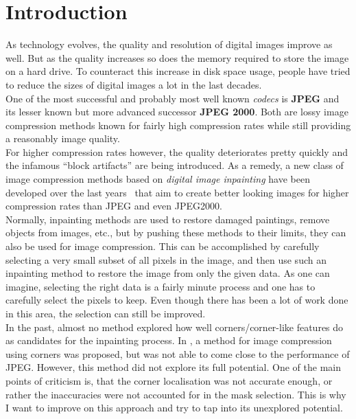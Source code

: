 \chapter{Introduction}\label{ch:Intro}
As technology evolves, the quality and resolution of digital images improve as well. But as the
quality increases so does the memory required to store the image on a hard drive. To counteract
this increase in disk space usage, people have tried to reduce the sizes of digital images a lot in the
last decades.\\
One of the most successful and probably most well known \textit{codecs}
is \textbf{JPEG}\cite{wallace91} and its lesser known but more advanced successor \textbf{JPEG 2000}\cite{jpeg2000}. Both are lossy image compression methods
known for fairly high compression rates while still providing a reasonably image quality.\\
For
higher compression rates however, the quality deteriorates pretty quickly and the infamous ``block
artifacts'' are being introduced. As a remedy, a new class of image compression methods based on
\textit{digital image inpainting} have been developed over the last
years~\cite{galic05, galic08, mainberger12, peloquin09, zimmer07, mainberger09, mainberger10, dong07, schmaltz09} that
aim to create better looking images for higher compression rates than JPEG and even JPEG2000. \\
Normally, inpainting methods are used to restore damaged paintings, remove objects from images,
etc., but by pushing these methods to their limits, they can also be used for image compression.
This can be accomplished by carefully selecting a very small subset of all pixels in the image, 
and then use such an inpainting method to restore the image from only the given data.
As one can imagine, selecting the right data is a fairly minute process and one has to carefully
select the pixels to keep. Even though there has been a lot of work done in this
area\cite{belhachmi09, schmaltz14, hoeltgen12}, the
selection can still be improved.\\
In the past, almost no method explored how well corners/corner-like features do as candidates for
the inpainting process. In \cite{zimmer07}, a method for image compression using corners was
proposed, but was not able to come close to the performance of JPEG. However, this method did not
explore its full potential. One of the main points of criticism is, that the corner localisation
was not accurate enough, or rather the inaccuracies were not accounted for in the mask
selection\cite{conversation}. This is why I want to improve on this approach and try to tap into
its unexplored potential.\\

